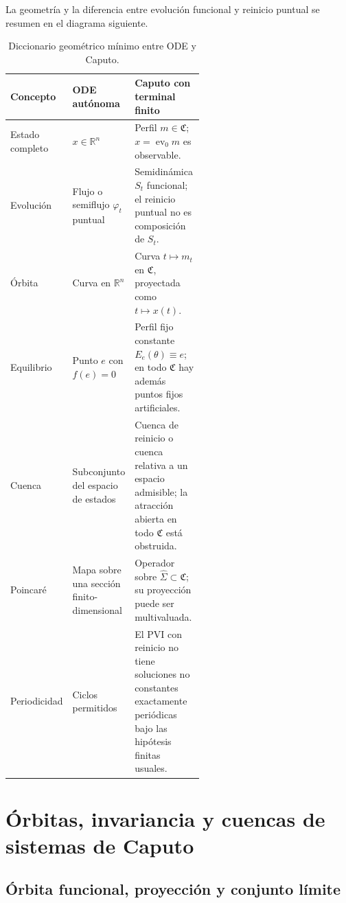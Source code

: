 La geometría y la diferencia entre evolución funcional y reinicio puntual se
resumen en el diagrama siguiente.



\begin{table}[ht]
\centering
\small
\caption{Diccionario geométrico mínimo entre ODE y Caputo.}
\label{tab:geofo-dictionary}
\begin{tabularx}{\linewidth}{@{}L{0.25\linewidth}L{0.31\linewidth}Y@{}}
\toprule
Concepto & ODE autónoma & Caputo con terminal finito \\
\midrule
Estado completo & \(x\in\mathbb R^n\) & Perfil
\(m\in\mathfrak C\); \(x=\operatorname{ev}_0m\) es observable.\\
Evolución & Flujo o semiflujo \(\varphi_t\) puntual & Semidinámica \(S_t\)
funcional; el reinicio puntual no es composición de \(S_t\).\\
Órbita & Curva en \(\mathbb R^n\) & Curva \(t\mapsto m_t\) en
\(\mathfrak C\), proyectada como \(t\mapsto x(t)\).\\
Equilibrio & Punto \(e\) con \(f(e)=0\) & Perfil fijo constante
\(E_e(\theta)\equiv e\); en todo \(\mathfrak C\) hay además puntos fijos
artificiales.\\
Cuenca & Subconjunto del espacio de estados & Cuenca de reinicio o cuenca
relativa a un espacio admisible; la atracción abierta en todo
\(\mathfrak C\) está obstruida.\\
Poincaré & Mapa sobre una sección finito-dimensional & Operador sobre
\(\widehat\Sigma\subset\mathfrak C\); su proyección puede ser multivaluada.\\
Periodicidad & Ciclos permitidos & El PVI con reinicio no tiene soluciones
no constantes exactamente periódicas bajo las hipótesis finitas usuales.\\
\bottomrule
\end{tabularx}
\end{table}

\fi

\ifnum{}\relax
\ifdefined\HAFOCaputoBlockSelect
\section{Órbitas, invariancia y cuencas de sistemas de Caputo}
\fi
\subsection{Órbita funcional, proyección y conjunto límite}

